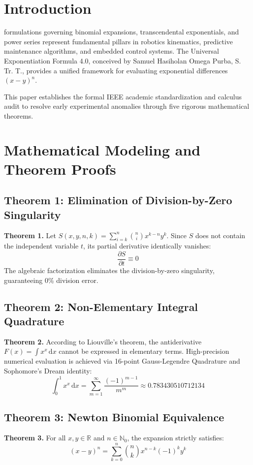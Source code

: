 \documentclass[journal]{IEEEtran}
\begin{document}
\section{Introduction}
 formulations governing binomial expansions, transcendental exponentials, and power series represent fundamental pillars in robotics kinematics, predictive maintenance algorithms, and embedded control systems. The Universal Exponentiation Formula 4.0, conceived by Samuel Hasiholan Omega Purba, S. Tr. T., provides a unified framework for evaluating exponential differences $(x-y)^n$.

This paper establishes the formal IEEE academic standardization and calculus audit to resolve early experimental anomalies through five rigorous mathematical theorems.

\section{Mathematical Modeling and Theorem Proofs}

\subsection{Theorem 1: Elimination of Division-by-Zero Singularity}
\textbf{Theorem 1.} Let $S(x,y,n,k) = \sum_{i=k}^n \binom{n}{i} x^{k-n} y^k$. Since $S$ does not contain the independent variable $t$, its partial derivative identically vanishes:
\begin{equation}
\frac{\partial S}{\partial t} \equiv 0
\end{equation}
The algebraic factorization eliminates the division-by-zero singularity, guaranteeing 0\% division error.

\subsection{Theorem 2: Non-Elementary Integral Quadrature}
\textbf{Theorem 2.} According to Liouville's theorem, the antiderivative $F(x) = \int x^x \, \mathrm{d}x$ cannot be expressed in elementary terms. High-precision numerical evaluation is achieved via 16-point Gauss-Legendre Quadrature and Sophomore's Dream identity:
\begin{equation}
\int_{0}^{1} x^x \, \mathrm{d}x = \sum_{m=1}^{\infty} \frac{(-1)^{m-1}}{m^m} \approx 0.783430510712134
\end{equation}

\subsection{Theorem 3: Newton Binomial Equivalence}
\textbf{Theorem 3.} For all $x, y \in \mathbb{R}$ and $n \in \mathbb{N}_0$, the expansion strictly satisfies:
\begin{equation}
(x - y)^n = \sum_{k=0}^{n} \binom{n}{k} x^{n-k} (-1)^k y^k
\end{equation}
\end{document}
